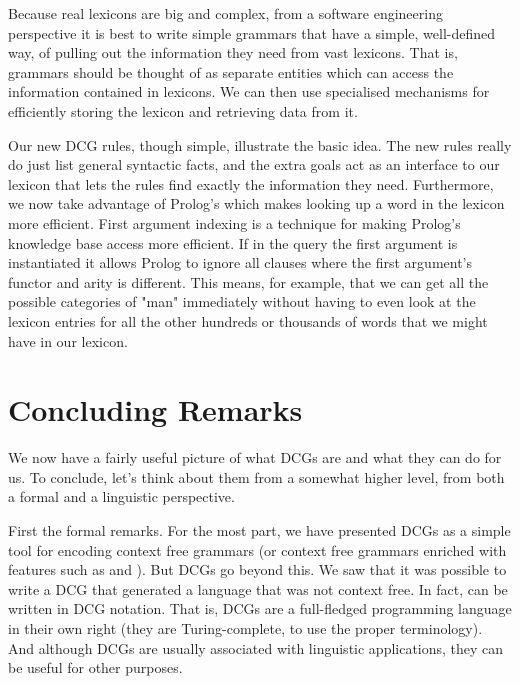 Because real lexicons are big and complex, from a software engineering
perspective it is best to write simple grammars that have a simple,
well-defined way, of pulling out the information they need from vast
lexicons. That is, grammars should be thought of as separate entities
which can access the information contained in lexicons. We can then
use specialised mechanisms for efficiently storing the lexicon and
retrieving data from it.

Our new DCG rules, though simple, illustrate the basic idea. The new
rules really do just list general syntactic facts, and the extra goals
act as an interface to our lexicon that lets the rules find exactly
the information they need. Furthermore, we now take advantage of
Prolog's
 which makes looking up a word in the
lexicon more efficient. First argument indexing is a technique for
making Prolog's knowledge base access more efficient. If in the query
the first argument is instantiated it allows Prolog to ignore all
clauses where the first argument's functor and arity is
different. This means, for example, that we can get all the possible
categories of "man" immediately without having to even look at the
lexicon entries for all the other hundreds or thousands of words that
we might have in our lexicon.

\section{Concluding Remarks}\label{SEC.L8.CONCLUDING.REMARKS}



We now have a fairly useful picture of what DCGs are and what they can
do for us.  To conclude, let's think about them from a somewhat higher
level, from both a formal and a linguistic perspective.

First the formal remarks.  For the most part, we have presented DCGs
as a simple tool for encoding context free grammars (or context free
grammars enriched with features such as  and
).  But DCGs go beyond this.  We saw that it was
possible to write a DCG that generated a language that was not context
free.  In fact,  can be written in DCG
notation.  That is, DCGs are a full-fledged programming language in
their own right (they are Turing-complete, to use the proper
terminology).  And although DCGs are usually associated with
linguistic applications, they can be useful for other purposes.


